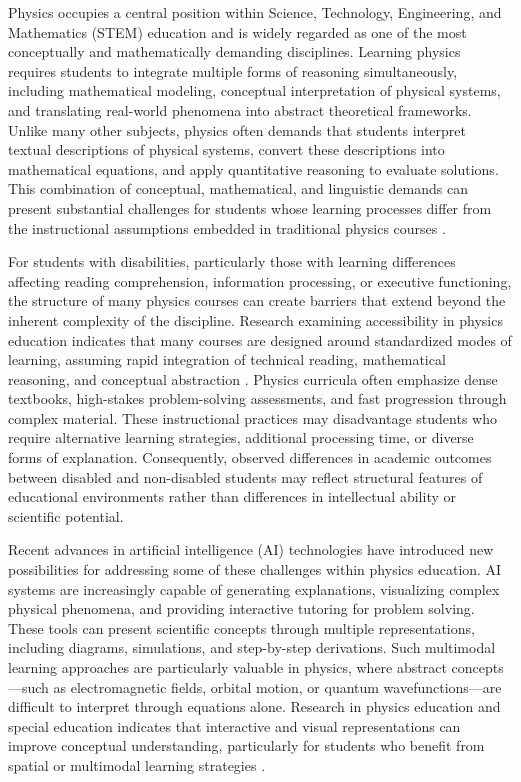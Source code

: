 \documentclass[]{aastex701}
\begin{document}
Physics occupies a central position within Science, Technology, Engineering, and Mathematics (STEM) education and is widely regarded as one of the most conceptually and mathematically demanding disciplines. Learning physics requires students to integrate multiple forms of reasoning simultaneously, including mathematical modeling, conceptual interpretation of physical systems, and translating real-world phenomena into abstract theoretical frameworks. Unlike many other subjects, physics often demands that students interpret textual descriptions of physical systems, convert these descriptions into mathematical equations, and apply quantitative reasoning to evaluate solutions. This combination of conceptual, mathematical, and linguistic demands can present substantial challenges for students whose learning processes differ from the instructional assumptions embedded in traditional physics courses \autocite{Chasen2025, Gull2025}.

For students with disabilities, particularly those with learning differences affecting reading comprehension, information processing, or executive functioning, the structure of many physics courses can create barriers that extend beyond the inherent complexity of the discipline. Research examining accessibility in physics education indicates that many courses are designed around standardized modes of learning, assuming rapid integration of technical reading, mathematical reasoning, and conceptual abstraction \autocite{Chasen2025, AlAzawei2023}. Physics curricula often emphasize dense textbooks, high-stakes problem-solving assessments, and fast progression through complex material. These instructional practices may disadvantage students who require alternative learning strategies, additional processing time, or diverse forms of explanation. Consequently, observed differences in academic outcomes between disabled and non-disabled students may reflect structural features of educational environments rather than differences in intellectual ability or scientific potential.

Recent advances in artificial intelligence (AI) technologies have introduced new possibilities for addressing some of these challenges within physics education. AI systems are increasingly capable of generating explanations, visualizing complex physical phenomena, and providing interactive tutoring for problem solving. These tools can present scientific concepts through multiple representations, including diagrams, simulations, and step-by-step derivations. Such multimodal learning approaches are particularly valuable in physics, where abstract concepts---such as electromagnetic fields, orbital motion, or quantum wavefunctions---are difficult to interpret through equations alone. Research in physics education and special education indicates that interactive and visual representations can improve conceptual understanding, particularly for students who benefit from spatial or multimodal learning strategies \autocite{Voultsiou2025, HarkinsBrown2025, Singh2001}.
\end{document}
